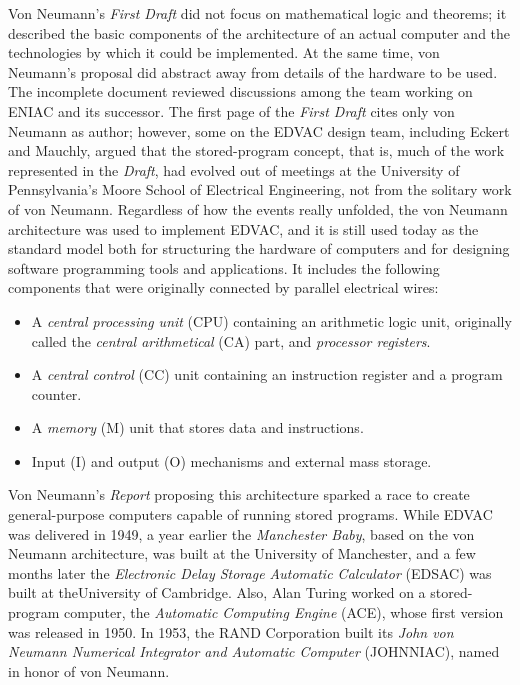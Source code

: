 Von Neumann's \textit{First Draft} did not focus on mathematical logic and theorems; it described the basic components of the architecture of an actual computer and the technologies by which it could be implemented. At the same time, von Neumann's proposal did abstract away from details of the hardware to be used. The incomplete document reviewed discussions among the team working on ENIAC and its successor. The first page of the \textit{First Draft} cites only von Neumann as author; \hbox{however,} some on the EDVAC design team, including Eckert and Mauchly, argued that the stored-program concept, that is, much of the work represented in the \textit{Draft}, had evolved out of meetings at the University of Pennsylvania's Moore School of Electrical Engineering, not from the solitary work of von Neumann. Regardless of how the events really unfolded, the von Neumann architecture was used to implement EDVAC, and it is still used today as the standard model both for structuring the hardware of computers and for designing software programming tools and applications. It includes the following components that were originally connected by parallel electrical wires:

\begin{itemize}
\item A \textit{central processing unit} (CPU) containing an arithmetic logic unit, originally called the \textit{central arithmetical} (CA) part, and \textit{processor registers}.

\item A \textit{central control} (CC) unit containing an instruction register and a program counter.

\item A \textit{memory} (M) unit that stores data and instructions.

\item Input (I) and output (O) mechanisms and external mass storage.
\end{itemize}

\noindent Von Neumann's \textit{Report} proposing this architecture sparked a race to create general-purpose computers capable of running stored programs. While EDVAC was delivered in 1949, a year earlier the \textit{Manchester Baby}, based on the von \hbox{Neumann} architecture, was built at the University of Manchester, and a few months later the \textit{Electronic Delay Storage Automatic Calculator} (EDSAC) was built at the\break University of Cambridge. Also, Alan Turing worked on a stored-program computer, the \textit{Automatic Computing Engine} (ACE), whose first version was released in 1950. In 1953, the RAND Corporation built its \textit{John von Neumann Numerical Integrator and Automatic Computer} (JOHNNIAC), named in honor of von Neumann.

